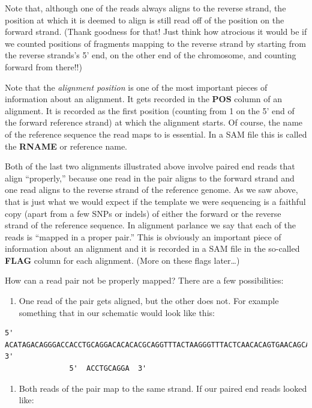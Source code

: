\documentclass[]{krantz}
\providecommand{\tightlist}{%
  \setlength{\itemsep}{0pt}\setlength{\parskip}{0pt}}
\begin{document}
Note that, although one of the reads always aligns to the reverse strand, the position
at which it is deemed to align is still read off of the position on the forward strand.
(Thank goodness for that! Just
think how atrocious it would be if we counted positions of fragments mapping to the reverse strand
by starting from the reverse strands's 5' end, on the other end of the chromosome, and counting
forward from there!!)

Note that the \emph{alignment position} is one of the most important pieces of information
about an alignment. It gets recorded in the \textbf{POS} column of an alignment. It is recorded as the
first position (counting from 1 on the 5' end of the forward reference strand) at which
the alignment starts. Of course, the name of the reference sequence the read maps to is
essential. In a SAM file this is called the \textbf{RNAME} or reference name.

Both of the last two alignments illustrated above involve paired end reads that align
``properly,'' because one read in the pair aligns to the forward strand and one read
aligns to the reverse strand of the reference genome. As we saw above, that is just what
we would expect if the template we were sequencing is a faithful copy (apart from a few SNPs
or indels) of either the forward or the reverse strand of the reference sequence. In alignment
parlance we say that each of the reads is ``mapped in a proper pair.'' This is obviously
an important piece of information about an alignment and it is recorded in a SAM file
in the so-called \textbf{FLAG} column for each alignment. (More on these flags later\ldots{})

How can a read pair not be properly mapped? There are a few possibilities:

\begin{enumerate}
\def\labelenumi{(\arabic{enumi})}
\tightlist
\item
  One read of the pair gets aligned, but the other does not. For example something
  that in our schematic would look like this:
\end{enumerate}

\begin{verbatim}
5'  ACATAGACAGGGACCACCTGCAGGACACACACGCAGGTTTACTAAGGGTTTACTCAACACAGTGAACAGCATATACCAGA  3'
               5'  ACCTGCAGGA  3'
\end{verbatim}

\begin{enumerate}
\def\labelenumi{(\arabic{enumi})}
\setcounter{enumi}{1}
\tightlist
\item
  Both reads of the pair map to the same strand. If our paired end reads looked like:
\end{enumerate}
\end{document}
